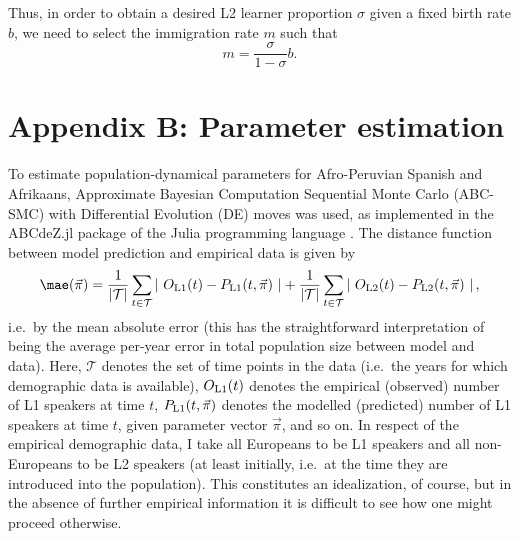 Thus, in order to obtain a desired L2 learner proportion \(\sigma\)
given a fixed birth rate \(b\), we need to select the immigration rate
\(m\) such that \[
m = \frac{\sigma}{1 - \sigma} b.
\]

\hypertarget{appendix-b-parameter-estimation}{%
\section*{Appendix B: Parameter
estimation}\label{appendix-b-parameter-estimation}}

To estimate population-dynamical parameters for Afro-Peruvian Spanish
and Afrikaans, Approximate Bayesian Computation Sequential Monte Carlo
(ABC-SMC) \autocite{Toni_etal_2009,Sunnaker_etal_2013} with Differential
Evolution (DE) moves \autocite{StornPrice1997,DasSuganthan2011} was
used, as implemented in the ABCdeZ.jl package of the Julia programming
language \autocite{Julia}. The distance function between model
prediction and empirical data is given by \[
\mae (\vec{\pi}) = \frac{1}{|\mathcal{T}|} \sum_{t \in \mathcal{T}} \left|\ O_\textnormal{L1}(t) - P_\textnormal{L1}(t, \vec{\pi})\ \right| + \frac{1}{|\mathcal{T}|} \sum_{t \in \mathcal{T}} \left|\ O_\textnormal{L2}(t) - P_\textnormal{L2}(t, \vec{\pi}) \ \right|,
\] i.e.~by the mean absolute error (this has the straightforward
interpretation of being the average per-year error in total population
size between model and data). Here, \(\mathcal{T}\) denotes the set of
time points in the data (i.e.~the years for which demographic data is
available), \(O_\textnormal{L1}(t)\) denotes the empirical (observed)
number of L1 speakers at time \(t\), \(P_\textnormal{L1}(t, \vec{\pi})\)
denotes the modelled (predicted) number of L1 speakers at time \(t\),
given parameter vector \(\vec{\pi}\), and so on. In respect of the
empirical demographic data, I take all Europeans to be L1 speakers and
all non-Europeans to be L2 speakers (at least initially, i.e.~at the
time they are introduced into the population). This constitutes an
idealization, of course, but in the absence of further empirical
information it is difficult to see how one might proceed otherwise.

